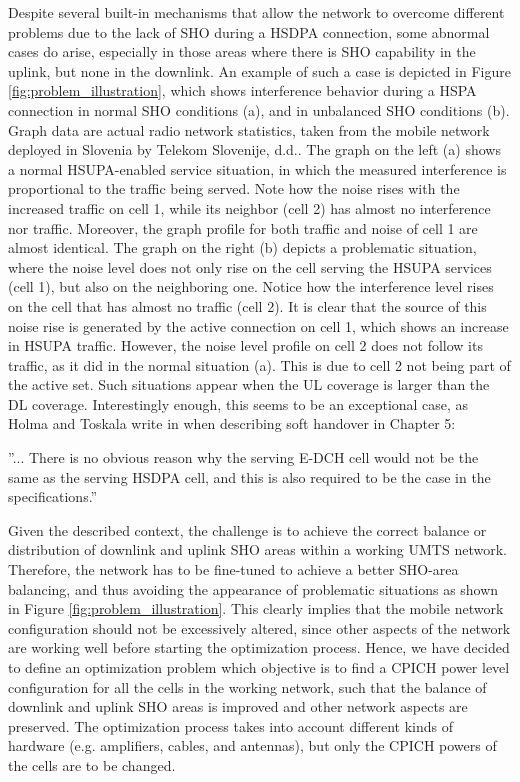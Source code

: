 Despite several built-in mechanisms that allow the network to overcome
different problems due to the lack of SHO during a HSDPA connection,
some abnormal cases do arise, especially in those areas where there
is SHO capability in the uplink, but none in the downlink. An example
of such a case is depicted in Figure \ref{fig:problem_illustration},
which shows interference behavior during a HSPA connection in normal
SHO conditions (a), and in unbalanced SHO conditions (b). Graph data
are actual radio network statistics, taken from the mobile network
deployed in Slovenia by Telekom Slovenije, d.d.. The graph on the
left (a) shows a normal HSUPA-enabled service situation, in which
the measured interference is proportional to the traffic being served.
Note how the noise rises with the increased traffic on cell 1, while
its neighbor (cell 2) has almost no interference nor traffic. Moreover,
the graph profile for both traffic and noise of cell 1 are almost
identical. The graph on the right (b) depicts a problematic situation,
where the noise level does not only rise on the cell serving the HSUPA
services (cell 1), but also on the neighboring one. Notice how the
interference level rises on the cell that has almost no traffic (cell
2). It is clear that the source of this noise rise is generated by
the active connection on cell 1, which shows an increase in HSUPA
traffic. However, the noise level profile on cell 2 does not follow
its traffic, as it did in the normal situation (a). This is due to
cell 2 not being part of the active set. Such situations appear when
the UL coverage is larger than the DL coverage. Interestingly enough,
this seems to be an exceptional case, as Holma and Toskala write in
\cite{holma2006hsdpa} when describing soft handover in Chapter 5:

''... There is no obvious reason why the serving E-DCH cell would
not be the same as the serving HSDPA cell, and this is also required
to be the case in the specifications.''

Given the described context, the challenge is to achieve the correct
balance or distribution of downlink and uplink SHO areas within a
working UMTS network. Therefore, the network has to be fine-tuned
to achieve a better SHO-area balancing, and thus avoiding the appearance
of problematic situations as shown in Figure \ref{fig:problem_illustration}.
This clearly implies that the mobile network configuration should
not be excessively altered, since other aspects of the network are
working well before starting the optimization process. Hence, we have
decided to define an optimization problem which objective is to find
a CPICH power level configuration for all the cells in the working
network, such that the balance of downlink and uplink SHO areas is
improved and other network aspects are preserved. The optimization
process takes into account different kinds of hardware (e.g. amplifiers,
cables, and antennas), but only the CPICH powers of the cells are
to be changed.

